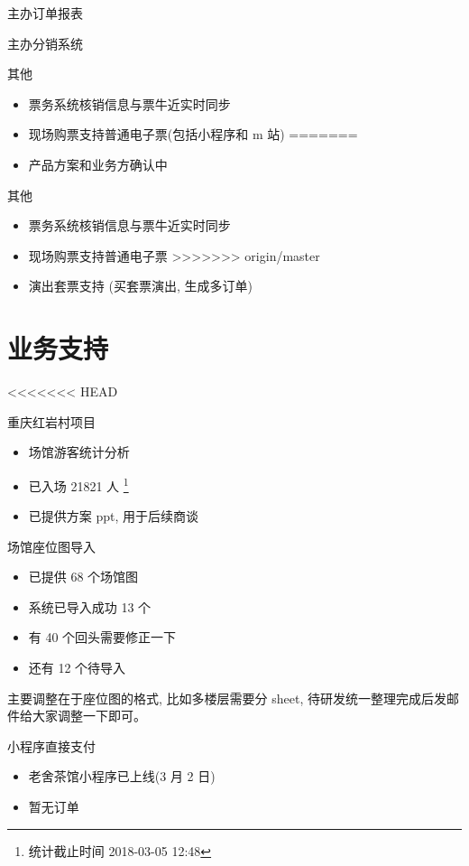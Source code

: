 \documentclass[presentation, bigger]{beamer}
\begin{document}
\begin{frame}[label={sec:orgb81fa7f}]{主办订单报表}
\begin{frame}[label={sec:org37bc7b4}]{主办分销系统}
\begin{frame}[label={sec:orgca769ad}]{其他}
\begin{itemize}
\item 票务系统核销信息与票牛近实时同步
\item 现场购票支持普通电子票(包括小程序和 m 站)
=======
\item 产品方案和业务方确认中
\end{itemize}
\end{frame}

\begin{frame}[label={sec:org0229188}]{其他}
\begin{itemize}
\item 票务系统核销信息与票牛近实时同步
\item 现场购票支持普通电子票
>>>>>>> origin/master
\item 演出套票支持 (买套票演出, 生成多订单)
\end{itemize}
\end{frame}

\section{业务支持}
<<<<<<< HEAD
\label{sec:org0405f5a}
\begin{frame}[label={sec:orgaedba16}]{重庆红岩村项目}
\begin{itemize}
\item 场馆游客统计分析
\item 已入场 21821 人 \footnote{统计截止时间 2018-03-05 12:48}
\item 已提供方案 ppt, 用于后续商谈
\end{itemize}
\end{frame}

\begin{frame}[label={sec:org82471f6}]{场馆座位图导入}
\begin{itemize}
\item 已提供 68 个场馆图
\item 系统已导入成功 13 个
\item 有 40 个回头需要修正一下
\item 还有 12 个待导入
\end{itemize}

主要调整在于座位图的格式, 比如多楼层需要分 sheet, 待研发统一整理完成后发邮件给大家调整一下即可。
\end{frame}

\begin{frame}[label={sec:org1286d31}]{小程序直接支付}
\begin{itemize}
\item 老舍茶馆小程序已上线(3 月 2 日)
\item 暂无订单
\end{itemize}
\end{frame}


\end{frame}
\end{frame}
\end{document}
